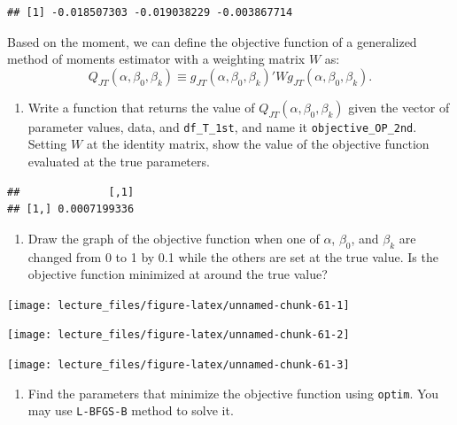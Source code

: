 \documentclass[]{book}
\providecommand{\tightlist}{%
  \setlength{\itemsep}{0pt}\setlength{\parskip}{0pt}}
\begin{document}
\begin{verbatim}
## [1] -0.018507303 -0.019038229 -0.003867714
\end{verbatim}

Based on the moment, we can define the objective function of a
generalized method of moments estimator with a weighting matrix \(W\)
as: \[
Q_{JT}(\alpha, \beta_0, \beta_k) \equiv g_{JT}(\alpha, \beta_0, \beta_k)' W g_{JT}(\alpha, \beta_0, \beta_k).
\]

\begin{enumerate}
\def\labelenumi{\arabic{enumi}.}
\setcounter{enumi}{6}
\tightlist
\item
  Write a function that returns the value of
  \(Q_{JT}(\alpha, \beta_0, \beta_k)\) given the vector of parameter
  values, data, and \texttt{df\_T\_1st}, and name it
  \texttt{objective\_OP\_2nd}. Setting \(W\) at the identity matrix,
  show the value of the objective function evaluated at the true
  parameters.
\end{enumerate}

\begin{verbatim}
##              [,1]
## [1,] 0.0007199336
\end{verbatim}

\begin{enumerate}
\def\labelenumi{\arabic{enumi}.}
\setcounter{enumi}{7}
\tightlist
\item
  Draw the graph of the objective function when one of \(\alpha\),
  \(\beta_0\), and \(\beta_k\) are changed from 0 to 1 by 0.1 while the
  others are set at the true value. Is the objective function minimized
  at around the true value?
\end{enumerate}

\begin{center}\texttt{[image: lecture\_files/figure-latex/unnamed-chunk-61-1]} \end{center}

\begin{center}\texttt{[image: lecture\_files/figure-latex/unnamed-chunk-61-2]} \end{center}

\begin{center}\texttt{[image: lecture\_files/figure-latex/unnamed-chunk-61-3]} \end{center}

\begin{enumerate}
\def\labelenumi{\arabic{enumi}.}
\setcounter{enumi}{8}
\tightlist
\item
  Find the parameters that minimize the objective function using
  \texttt{optim}. You may use \texttt{L-BFGS-B} method to solve it.
\end{enumerate}
\end{document}
